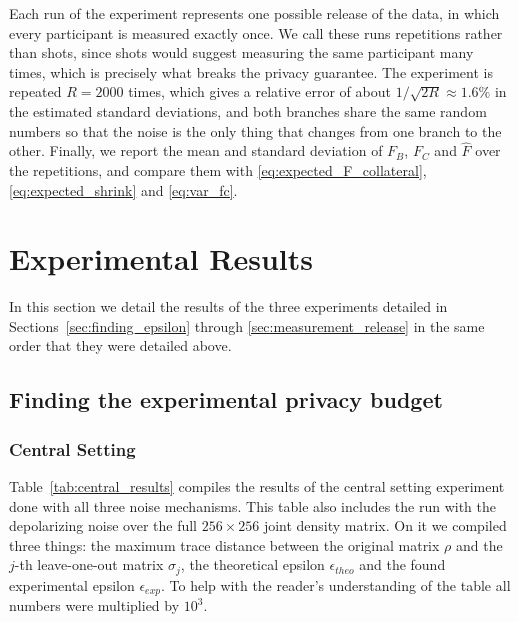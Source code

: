 \documentclass{ieeeaccess}
\begin{document}
Each run of the experiment represents one possible release of the data, in which every participant is measured exactly once. We call these runs repetitions rather than shots, since shots would suggest measuring the same participant many times, which is precisely what breaks the privacy guarantee. The experiment is repeated $R = 2000$ times, which gives a relative error of about $1/\sqrt{2R} \approx 1.6\%$ in the estimated standard deviations, and both branches share the same random numbers so that the noise is the only thing that changes from one branch to the other. Finally, we report the mean and standard deviation of $F_B$, $F_C$ and $\hat{F}$ over the repetitions, and compare them with \eqref{eq:expected_F_collateral}, \eqref{eq:expected_shrink} and \eqref{eq:var_fc}.

\section{Experimental Results}
\label{sec:experimental_results}

In this section we detail the results of the three experiments detailed in Sections~\ref{sec:finding_epsilon} through \ref{sec:measurement_release} in the same order that they were detailed above.

\subsection{Finding the experimental privacy budget}

\subsubsection{Central Setting}

Table~\ref{tab:central_results} compiles the results of the central setting experiment done with all three noise mechanisms. This table also includes the run with the depolarizing noise over the full $256 \times 256$ joint density matrix. On it we compiled three things: the maximum trace distance between the original matrix $\rho$ and the $j$-th leave-one-out matrix $\sigma_j$, the theoretical epsilon $\epsilon_{theo}$ and the found experimental epsilon $\epsilon_{exp}$. To help with the reader's understanding of the table all numbers were multiplied by $10^{3}$.
\end{document}

